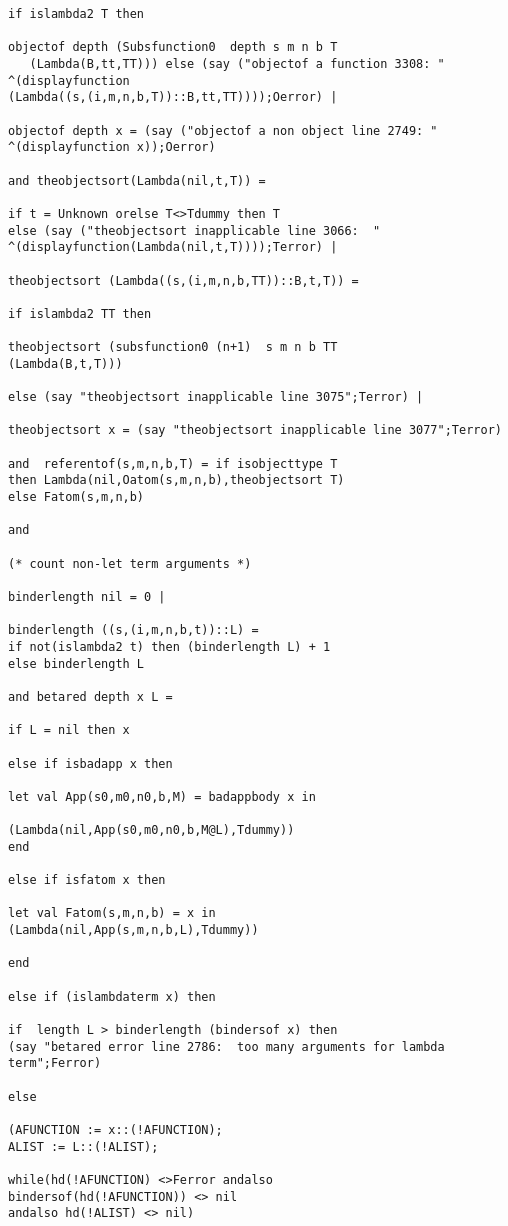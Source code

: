 \documentclass[12pt]{article}
\begin{document}
\begin{verbatim}
if islambda2 T then 

objectof depth (Subsfunction0  depth s m n b T
   (Lambda(B,tt,TT))) else (say ("objectof a function 3308: "
^(displayfunction 
(Lambda((s,(i,m,n,b,T))::B,tt,TT))));Oerror) |

objectof depth x = (say ("objectof a non object line 2749: "
^(displayfunction x));Oerror)

and theobjectsort(Lambda(nil,t,T)) = 

if t = Unknown orelse T<>Tdummy then T 
else (say ("theobjectsort inapplicable line 3066:  "
^(displayfunction(Lambda(nil,t,T))));Terror) |

theobjectsort (Lambda((s,(i,m,n,b,TT))::B,t,T)) =

if islambda2 TT then 

theobjectsort (subsfunction0 (n+1)  s m n b TT 
(Lambda(B,t,T)))

else (say "theobjectsort inapplicable line 3075";Terror) |

theobjectsort x = (say "theobjectsort inapplicable line 3077";Terror)

and  referentof(s,m,n,b,T) = if isobjecttype T 
then Lambda(nil,Oatom(s,m,n,b),theobjectsort T)
else Fatom(s,m,n,b)

and  

(* count non-let term arguments *)

binderlength nil = 0 |

binderlength ((s,(i,m,n,b,t))::L) =
if not(islambda2 t) then (binderlength L) + 1
else binderlength L

and betared depth x L =

if L = nil then x

else if isbadapp x then

let val App(s0,m0,n0,b,M) = badappbody x in

(Lambda(nil,App(s0,m0,n0,b,M@L),Tdummy)) 
end

else if isfatom x then 

let val Fatom(s,m,n,b) = x in
(Lambda(nil,App(s,m,n,b,L),Tdummy))

end

else if (islambdaterm x) then

if  length L > binderlength (bindersof x) then 
(say "betared error line 2786:  too many arguments for lambda term";Ferror)

else

(AFUNCTION := x::(!AFUNCTION);
ALIST := L::(!ALIST);

while(hd(!AFUNCTION) <>Ferror andalso 
bindersof(hd(!AFUNCTION)) <> nil
andalso hd(!ALIST) <> nil)


\end{verbatim}
\end{document}
